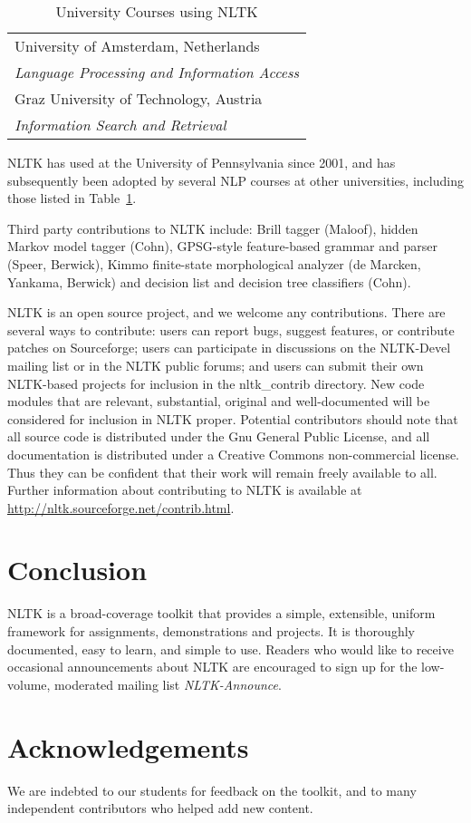 \documentclass[11pt]{article}
\begin{document}
\begin{table}[bth]
\begin{boxedminipage}{\linewidth}
\begin{tabular}{l}
University of Amsterdam, Netherlands \\
\hspace{2ex}
\textit{Language Processing and Information Access} \\[.5ex]

Graz University of Technology, Austria \\
\hspace{2ex}
\textit{Information Search and Retrieval} \\[.5ex]

\end{tabular}
\caption{University Courses using NLTK}\label{tab:courses}
\end{boxedminipage}
\end{table}

NLTK has used at the University of Pennsylvania since 2001, and has
subsequently been adopted by several NLP courses at other
universities, including those listed in Table~\ref{tab:courses}.

Third party contributions to NLTK include: Brill tagger (Maloof),
hidden Markov model tagger (Cohn), GPSG-style feature-based grammar
and parser (Speer, Berwick), Kimmo finite-state morphological analyzer
(de Marcken, Yankama, Berwick) and decision list and decision tree
classifiers (Cohn).

NLTK is an open source project, and we welcome any contributions.
There are several ways to contribute: users can report bugs, suggest
features, or contribute patches on Sourceforge; users can participate
in discussions on the NLTK-Devel mailing list or in the NLTK public
forums; and users can submit their own NLTK-based projects for
inclusion in the nltk\_contrib directory.  New code modules that are
relevant, substantial, original and well-documented will be considered
for inclusion in NLTK proper.  Potential contributors should note that
all source code is distributed under the Gnu General Public License,
and all documentation is distributed under a Creative Commons
non-commercial license.  Thus they can be confident that their
work will remain freely available to all.  Further information about
contributing to NLTK is available at \url{http://nltk.sourceforge.net/contrib.html}.

\section{Conclusion}

NLTK is a broad-coverage toolkit that provides a simple, extensible,
uniform framework for assignments, demonstrations and projects.  It is
thoroughly documented, easy to learn, and simple to use.  Readers who
would like to receive occasional announcements about NLTK are
encouraged to sign up for the low-volume, moderated mailing list
\textit{NLTK-Announce}.

\section{Acknowledgements}

We are indebted to our students for feedback on the toolkit, and to
many independent contributors who helped add new content.



\end{document}
